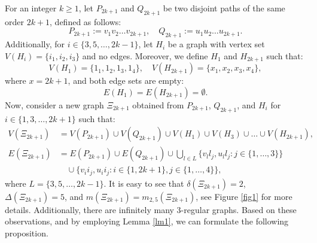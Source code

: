 \documentclass[12pt]{article}
\begin{document}
For an integer \( k \geq 1 \), let \( P_{2k+1} \) and \( Q_{2k+1} \) be two disjoint paths of the same order \( 2k+1 \), defined as follows: 
\[
P_{2k+1} := v_1 v_2 \ldots v_{2k+1}, \quad Q_{2k+1} := u_1 u_2 \ldots u_{2k+1}.
\]
Additionally, for \( i \in \{3, 5, \ldots, 2k-1\} \), let \( H_i \) be a graph with vertex set \( V(H_i) = \{i_1, i_2, i_3\} \) and no edges. Moreover, we define \( H_1 \) and \( H_{2k+1} \) such that:
\[
V(H_1) = \{1_1, 1_2, 1_3, 1_4\}, \quad V(H_{2k+1}) = \{x_1, x_2, x_3, x_4\},
\]
where $x=2k+1$, and both edge sets are empty:
\[
E(H_1) = E(H_{2k+1}) = \emptyset.
\]
Now, consider a new graph \( \Xi_{2k+1} \) obtained from \( P_{2k+1} \), \( Q_{2k+1} \), and \( H_i \) for \( i \in \{1, 3, \ldots, 2k+1\} \) such that:
\begin{align*}
V(\Xi_{2k+1}) &= V(P_{2k+1}) \cup V(Q_{2k+1}) \cup V(H_1) \cup V(H_3) \cup \ldots \cup V(H_{2k+1}), \\
E(\Xi_{2k+1}) &= E(P_{2k+1}) \cup E(Q_{2k+1}) \cup \bigcup_{l \in L} \{v_l l_j, u_l l_j : j \in \{1, \ldots, 3\}\} \\
&\quad \cup \{v_i i_j, u_i i_j : i \in \{1, 2k+1\}, j \in \{1, \ldots, 4\}\},
\end{align*}
where \( L = \{3, 5, \ldots, 2k-1\} \). It is easy to see that \( \delta(\Xi_{2k+1}) = 2 \), \( \Delta(\Xi_{2k+1}) = 5 \), and \( m(\Xi_{2k+1}) = m_{2,5}(\Xi_{2k+1}) \), see Figure \ref{fig1} for more details.  Additionally, there are infinitely many 3-regular graphs. Based on these observations, and by employing Lemma \ref{lm1}, we can formulate the following proposition.
\end{document}
